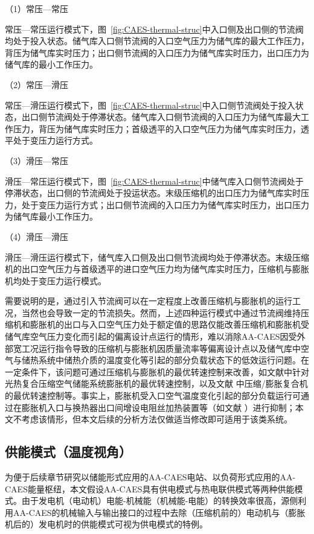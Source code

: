 （1）常压—常压

 常压—常压运行模式下，图~\ref{fig:CAES-thermal-struc}中入口侧及出口侧的节流阀均处于投入状态。储气库入口侧节流阀的入口空气压力为储气库的最大工作压力，背压为储气库实时压力；出口侧节流阀的入口压力为储气库实时压力，出口压力为储气库的最小工作压力。

（2）常压—滑压

 常压—滑压运行模式下，图~\ref{fig:CAES-thermal-struc}中入口侧节流阀处于投入状态，出口侧节流阀处于停滞状态。储气库入口侧节流阀的入口压力为储气库最大工作压力，背压为储气库实时压力；首级透平的入口空气压力为储气库实时压力，透平处于变压力运行方式。

（3）滑压—常压

滑压—常压运行模式下，图~\ref{fig:CAES-thermal-struc}中储气库入口侧节流阀处于停滞状态，出口侧的节流阀处于投运状态。末级压缩机的出口压力为储气库实时压力，处于变压力运行方式；出口侧节流阀的入口压力为储气库实时压力，出口压力为储气库最小工作压力。

（4）滑压—滑压

滑压—滑压运行模式下，储气库入口侧及出口侧节流阀均处于停滞状态。末级压缩机的出口空气压力与首级透平的进口空气压力均为储气库实时压力，压缩机与膨胀机均处于变压力运行模式。

需要说明的是，通过引入节流阀可以在一定程度上改善压缩机与膨胀机的运行工况，当然也会导致一定的节流损失。然而，上述四种运行模式中通过节流阀维持压缩机和膨胀机的出口与入口空气压力处于额定值的思路仅能改善压缩机和膨胀机受储气库空气压力变化而引起的偏离设计点运行的情形，难以消除AA-CAES因受外部宽工况运行指令导致的压缩机与膨胀机因质量流率等偏离设计点以及储气库中空气与储热系统中储热介质的温度变化等引起的部分负载状态下的低效运行问题。在一定条件下，该问题可通过压缩机与膨胀机的最优转速控制来改善，如文献中针对光热复合压缩空气储能系统膨胀机的最优转速控制，以及文献 中压缩/膨胀复合机的最优转速控制等。事实上，膨胀机受入口空气温度变化引起的部分负载运行可通过在膨胀机入口与换热器出口间增设电阻丝加热装置等（如文献
）进行抑制；本文不考虑该情形，但本文后续的分析方法仅做适当修改即可适用于该类系统。

\subsection{供能模式（温度视角）}
为便于后续章节研究以储能形式应用的AA-CAES电站、以负荷形式应用的AA-CAES能量枢纽，本文假设AA-CAES具有供电模式与热电联供模式等两种供能模式。由于发电机（电动机）电能-机械能（机械能-电能）的转换效率很高，源侧利用AA-CAES的机械输入与输出接口的过程中去除（压缩机前的）电动机与（膨胀机后的）发电机时的供能模式可视为供电模式的特例。

